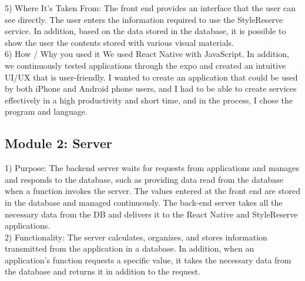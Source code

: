 \documentclass[conference]{IEEEtran}
\begin{document}
5) Where It’s Taken From: The front end provides an interface that the user can see directly. The user enters the information required to use the StyleReserve service. In addition, based on the data stored in the database, it is possible to show the user the contents stored with various visual materials.\\

6) How / Why you used it
We used React Native with JavaScript. In addition, we continuously tested applications through the expo and created an intuitive UI/UX that is user-friendly. I wanted to create an application that could be used by both iPhone and Android phone users, and I had to be able to create services effectively in a high productivity and short time, and in the process, I chose the program and language.\\


\subsection{Module 2: Server}
1) Purpose: The backend server waits for requests from applications and manages and responds to the database, such as providing data read from the database when a function invokes the server. The values entered at the front end are stored in the database and managed continuously. The back-end server takes all the necessary data from the DB and delivers it to the React Native and StyleReserve applications.\\

2) Functionality: The server calculates, organizes, and stores information transmitted from the application in a database. In addition, when an application's function requests a specific value, it takes the necessary data from the database and returns it in addition to the request.\\
\end{document}
